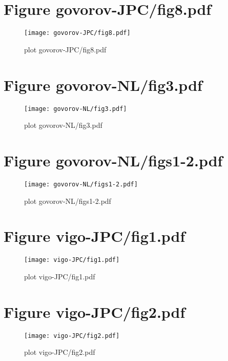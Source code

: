 \documentclass[12pt, a4paper]{article}
\begin{document}
\pagebreak

\section{Figure govorov-JPC/fig8.pdf}
\begin{figure}[!Hb]
  \centering
  \texttt{[image: govorov-JPC/fig8.pdf]}
  \caption{plot govorov-JPC/fig8.pdf}
\end{figure}


\pagebreak

\section{Figure govorov-NL/fig3.pdf}
\begin{figure}[!Hb]
  \centering
  \texttt{[image: govorov-NL/fig3.pdf]}
  \caption{plot govorov-NL/fig3.pdf}
\end{figure}


\pagebreak

\section{Figure govorov-NL/figs1-2.pdf}
\begin{figure}[!Hb]
  \centering
  \texttt{[image: govorov-NL/figs1-2.pdf]}
  \caption{plot govorov-NL/figs1-2.pdf}
\end{figure}


\pagebreak

\section{Figure vigo-JPC/fig1.pdf}
\begin{figure}[!Hb]
  \centering
  \texttt{[image: vigo-JPC/fig1.pdf]}
  \caption{plot vigo-JPC/fig1.pdf}
\end{figure}


\pagebreak

\section{Figure vigo-JPC/fig2.pdf}
\begin{figure}[!Hb]
  \centering
  \texttt{[image: vigo-JPC/fig2.pdf]}
  \caption{plot vigo-JPC/fig2.pdf}
\end{figure}


\pagebreak
\end{document}
